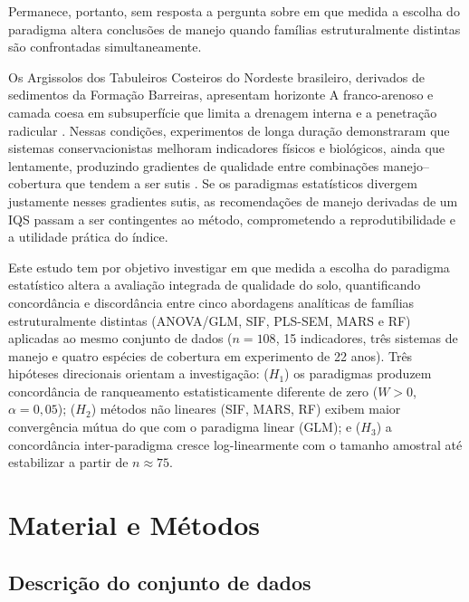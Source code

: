 \documentclass[pdflatex,sn-basic]{sn-jnl}%
\begin{document}
Permanece, portanto, sem resposta a pergunta sobre em que medida a escolha do paradigma altera conclusões de manejo quando famílias estruturalmente distintas são confrontadas simultaneamente.

Os Argissolos dos Tabuleiros Costeiros do Nordeste brasileiro, derivados de sedimentos da Formação Barreiras, apresentam horizonte A franco-arenoso e camada coesa em subsuperfície que limita a drenagem interna e a penetração radicular \cite{LimaNeto2010}. Nessas condições, experimentos de longa duração demonstraram que sistemas conservacionistas melhoram indicadores físicos e biológicos, ainda que lentamente, produzindo gradientes de qualidade entre combinações manejo--cobertura que tendem a ser sutis \cite{Assuncao2023,Oliveira2020,Lopes2021}. Se os paradigmas estatísticos divergem justamente nesses gradientes sutis, as recomendações de manejo derivadas de um IQS passam a ser contingentes ao método, comprometendo a reprodutibilidade e a utilidade prática do índice.

Este estudo tem por objetivo investigar em que medida a escolha do paradigma estatístico altera a avaliação integrada de qualidade do solo, quantificando concordância e discordância entre cinco abordagens analíticas de famílias estruturalmente distintas (ANOVA/GLM, SIF, PLS-SEM, MARS e RF) aplicadas ao mesmo conjunto de dados ($n = 108$, 15 indicadores, três sistemas de manejo e quatro espécies de cobertura em experimento de 22 anos). Três hipóteses direcionais orientam a investigação: ($H_1$) os paradigmas produzem concordância de ranqueamento estatisticamente diferente de zero ($W > 0$, $\alpha = 0{,}05$); ($H_2$) métodos não lineares (SIF, MARS, RF) exibem maior convergência mútua do que com o paradigma linear (GLM); e ($H_3$) a concordância inter-paradigma cresce log-linearmente com o tamanho amostral até estabilizar a partir de $n \approx 75$.

\section{Material e Métodos}\label{sec:material}

\subsection{Descrição do conjunto de dados}\label{subsec:dataset}
\end{document}
